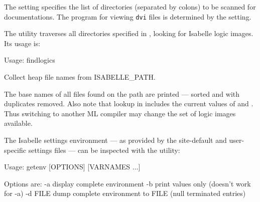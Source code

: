 \begin{isabellebody}
\begin{isamarkuptext}
  \medskip The \hyperlink{setting.ISABELLE-DOCS}{\mbox{}} setting specifies the list of
  directories (separated by colons) to be scanned for documentations.
  The program for viewing \verb|dvi| files is determined by the
  \hyperlink{setting.DVI-VIEWER}{\mbox{}} setting.%
\end{isamarkuptext}%
\isamarkuptrue%
%
\isamarkuptrue%
%
\begin{isamarkuptext}%
The \hypertarget{tool.findlogics}{\hyperlink{tool.findlogics}{\mbox{}}} utility traverses all directories
  specified in \hyperlink{setting.ISABELLE-PATH}{\mbox{}}, looking for Isabelle logic
  images. Its usage is:
\begin{ttbox}
Usage: findlogics

  Collect heap file names from ISABELLE_PATH.
\end{ttbox}

  The base names of all files found on the path are printed --- sorted
  and with duplicates removed. Also note that lookup in \hyperlink{setting.ISABELLE-PATH}{\mbox{}} includes the current values of \hyperlink{setting.ML-SYSTEM}{\mbox{}}
  and \hyperlink{setting.ML-PLATFORM}{\mbox{}}. Thus switching to another ML compiler
  may change the set of logic images available.%
\end{isamarkuptext}%
\isamarkuptrue%
%
\isamarkuptrue%
%
\begin{isamarkuptext}%
The Isabelle settings environment --- as provided by the
  site-default and user-specific settings files --- can be inspected
  with the \hypertarget{tool.getenv}{\hyperlink{tool.getenv}{\mbox{}}} utility:
\begin{ttbox}
Usage: getenv [OPTIONS] [VARNAMES ...]

  Options are:
    -a           display complete environment
    -b           print values only (doesn't work for -a)
    -d FILE      dump complete environment to FILE
                 (null terminated entries)


\end{ttbox}
\end{isamarkuptext}
\end{isabellebody}
